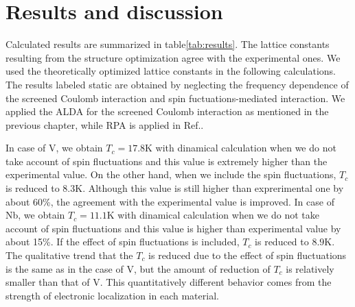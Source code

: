 \section{Results and discussion}
Calculated results are summarized in table\ref{tab:results}.
The lattice constants resulting from the structure optimization agree with the experimental ones.
We used the theoretically optimized lattice constants in the following calculations.
The results labeled static are obtained by neglecting the frequency dependence of the 
screened Coulomb interaction and spin fuctuations-mediated interaction.
We applied the ALDA for the screened Coulomb interaction as mentioned in the previous chapter, 
while RPA is applied in Ref.\cite{RA2013}.

In case of V, we obtain $T_c = 17.8$K with dinamical calculation when we do not take account of 
spin fluctuations and this value is extremely higher than the experimental value.
On the other hand, when we include the spin fluctuations, $T_c$ is reduced to $8.3$K.
Although this value is still higher than exprerimental one by about 60\%, the agreement with 
the experimental value is improved.
In case of Nb, we obtain $T_c = 11.1$K with dinamical calculation when we do not take account of 
spin fluctuations and this value is higher than experimental value by about 15\%.
If the effect of spin fluctuations is included, $T_c$ is reduced to $8.9$K.
The qualitative trend that the $T_c$ is reduced due to the effect of spin fluctuations is the same as 
in the case of V, but the amount of reduction of $T_c$ is relatively smaller than that of V.
This quantitatively different behavior comes from the strength of electronic localization in each material.


